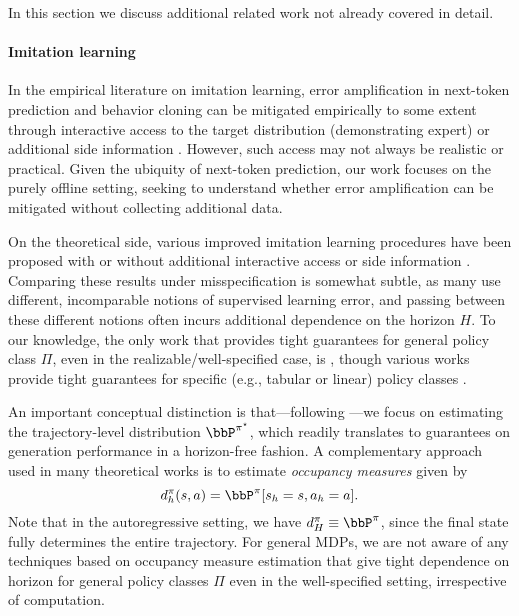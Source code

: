 
In this section we discuss additional related work not already covered
in detail.

\paragraph{Imitation learning} In the empirical literature on
imitation learning,
error amplification in next-token prediction and behavior
  cloning can be mitigated empirically to some extent through interactive access
  to the target distribution (demonstrating expert)
  \citep{ross2013learning,kim2013learning,gupta2017cognitive,bansal2018chauffeurnet,laskey2017dart,
    choudhury2018data,kelly2019hg,barnes2023world,zhuang2023robot,lum2024dextrah}
  or additional side information
  \citep{pfrommer2022tasil,block2024provable}. However, such access
  may not always be realistic or practical. Given the ubiquity of next-token
  prediction, our work focuses on the purely offline setting, seeking
  to understand whether error amplification can be
  mitigated without collecting additional data.

On the theoretical side, various improved imitation learning
procedures have been proposed with or without additional interactive
access or side information  
\citep{ross2010efficient,ross2011reduction,ross2014reinforcement,sun2017deeply,cheng2018convergence,cheng2020policy,cheng2019accelerating,yan2021explaining,spencer2021feedback}. Comparing
these results under misspecification is somewhat subtle, as many use
different, incomparable notions of supervised learning error, and
passing between these different notions often incurs additional
dependence on the horizon $H$. To our knowledge, the only work that
provides tight guarantees for general policy class $\Pi$, even in the
realizable/well-specified case, is \citet{foster2024behavior}, though
various works provide tight guarantees for specific (e.g., tabular or linear)
policy classes
\citep{rajaraman2020toward,rajaraman2021value,rajaraman2021provably}.

An important conceptual distinction is that---following
\citet{foster2024behavior}---we focus on estimating the
trajectory-level distribution $\bbP^{\pistar}$, which readily
translates to guarantees on generation performance in a horizon-free
fashion. A complementary approach used in many theoretical works
\citep{rajaraman2020toward,swamy2021moments} is to estimate
\emph{occupancy measures} given by
\[
  d_h^{\pi}(s,a)
  = \bbP^{\pi}\brk*{s_h=s, a_h=a}.
\]
Note that in the autoregressive setting, we have
$d_{H}^{\pi}\equiv\bbP^{\pi}$, since the final state fully determines the entire trajectory. For general MDPs, we are not aware of any
techniques based on occupancy measure estimation that give tight
dependence on horizon for general policy classes $\Pi$ even in the well-specified setting, irrespective of
computation.\loose

